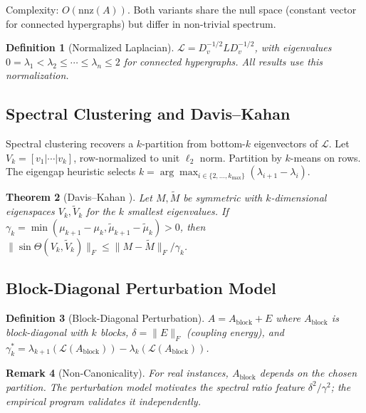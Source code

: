\documentclass[12pt]{article}
\newtheorem{theorem}{Theorem}[section]
\newtheorem{definition}[theorem]{Definition}
\newtheorem{remark}[theorem]{Remark}
\begin{document}
Complexity: $O(\mathrm{nnz}(A))$.  Both variants share the null space (constant
vector for connected hypergraphs) but differ in non-trivial spectrum.

\begin{definition}[Normalized Laplacian]
\label{def:normalized-laplacian}
$\mathcal{L} = D_v^{-1/2} L D_v^{-1/2}$, with eigenvalues
$0 = \lambda_1 < \lambda_2 \leq \cdots \leq \lambda_n \leq 2$ for connected
hypergraphs.  All results use this normalization.
\end{definition}

\subsection{Spectral Clustering and Davis--Kahan}
\label{sec:spectral-clustering}

Spectral clustering \citep{ng2001spectral,von2007tutorial} recovers a
$k$-partition from bottom-$k$ eigenvectors of $\mathcal{L}$.  Let
$V_k = [v_1 | \cdots | v_k]$, row-normalized to unit $\ell_2$ norm.
Partition by $k$-means on rows.  The eigengap heuristic selects
$k = \arg\max_{i \in \{2,\ldots,k_{\max}\}} (\lambda_{i+1} - \lambda_i)$.

\begin{theorem}[Davis--Kahan \citep{davis1970rotation,stewart1990matrix}]
\label{thm:davis-kahan}
Let $M, \tilde{M}$ be symmetric with $k$-dimensional eigenspaces $V_k, \tilde{V}_k$
for the $k$ smallest eigenvalues.  If
$\gamma_k = \min(\mu_{k+1} - \mu_k, \tilde{\mu}_{k+1} - \tilde{\mu}_k) > 0$, then
$\|\sin\Theta(V_k, \tilde{V}_k)\|_F \leq \|M - \tilde{M}\|_F / \gamma_k$.
\end{theorem}

\subsection{Block-Diagonal Perturbation Model}
\label{sec:perturbation}

\begin{definition}[Block-Diagonal Perturbation]
\label{def:perturbation}
$A = A_{\mathrm{block}} + E$ where $A_{\mathrm{block}}$ is block-diagonal with
$k$ blocks, $\delta = \|E\|_F$ (coupling energy), and
$\gamma_k^* = \lambda_{k+1}(\mathcal{L}(A_{\mathrm{block}})) - \lambda_k(\mathcal{L}(A_{\mathrm{block}}))$.
\end{definition}

\begin{remark}[Non-Canonicality]
For real instances, $A_{\mathrm{block}}$ depends on the chosen partition.
The perturbation model motivates the spectral ratio feature
$\delta^2/\gamma^2$; the empirical program validates it independently.
\end{remark}
\end{document}
